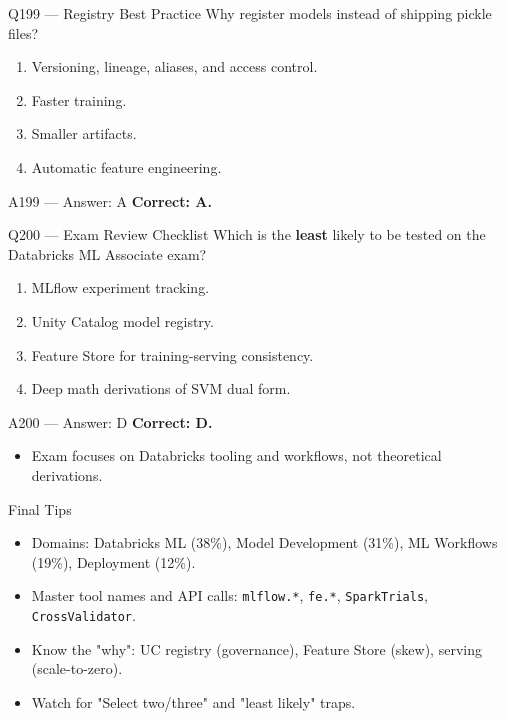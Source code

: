 \documentclass[aspectratio=169,9pt]{beamer}
\begin{document}
	\begin{frame}{Q199 --- Registry Best Practice}
		Why register models instead of shipping pickle files?
		\begin{enumerate}[label=\Alph*.]
			\item Versioning, lineage, aliases, and access control.
			\item Faster training.
			\item Smaller artifacts.
			\item Automatic feature engineering.
		\end{enumerate}
	\end{frame}
	
	\begin{frame}{A199 --- Answer: A}
		\textbf{Correct: A.}
	\end{frame}
	
	\begin{frame}{Q200 --- Exam Review Checklist}
		Which is the \textbf{least} likely to be tested on the Databricks ML Associate exam?
		\begin{enumerate}[label=\Alph*.]
			\item MLflow experiment tracking.
			\item Unity Catalog model registry.
			\item Feature Store for training-serving consistency.
			\item Deep math derivations of SVM dual form.
		\end{enumerate}
	\end{frame}
	
	\begin{frame}{A200 --- Answer: D}
		\textbf{Correct: D.}
		\begin{itemize}
			\item Exam focuses on Databricks tooling and workflows, not theoretical derivations.
		\end{itemize}
	\end{frame}
	
	\begin{frame}{Final Tips}
		\begin{itemize}
			\item Domains: Databricks ML (38\%), Model Development (31\%), ML Workflows (19\%), Deployment (12\%).
			\item Master tool names and API calls: \texttt{mlflow.*}, \texttt{fe.*}, \texttt{SparkTrials}, \texttt{CrossValidator}.
			\item Know the "why": UC registry (governance), Feature Store (skew), serving (scale-to-zero).
			\item Watch for "Select two/three" and "least likely" traps.
		\end{itemize}
	\end{frame}
	
\end{document}
